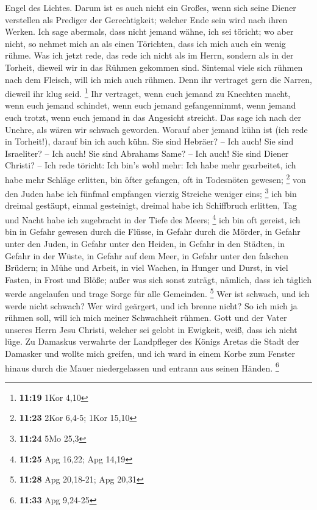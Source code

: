 Engel des Lichtes.  Darum ist es auch nicht ein Großes,
wenn sich seine Diener verstellen als Prediger der Gerechtigkeit;
welcher Ende sein wird nach ihren Werken.  Ich sage
abermals, dass nicht jemand wähne, ich sei töricht; wo aber nicht, so
nehmet mich an als einen Törichten, dass ich mich auch ein wenig rühme.
 Was ich jetzt rede, das rede ich nicht als im Herrn,
sondern als in der Torheit, dieweil wir in das Rühmen gekommen sind.
 Sintemal viele sich rühmen nach dem Fleisch, will ich
mich auch rühmen.  Denn ihr vertraget gern die Narren,
dieweil ihr klug seid. \footnote{\textbf{11:19} 1Kor 4,10}
 Ihr vertraget, wenn euch jemand zu Knechten macht, wenn
euch jemand schindet, wenn euch jemand gefangennimmt, wenn jemand euch
trotzt, wenn euch jemand in das Angesicht streicht.  Das
sage ich nach der Unehre, als wären wir schwach geworden. Worauf aber
jemand kühn ist (ich rede in Torheit!), darauf bin ich auch kühn.
 Sie sind Hebräer? -- Ich auch! Sie sind Israeliter? --
Ich auch! Sie sind Abrahams Same? -- Ich auch!  Sie sind
Diener Christi? -- Ich rede töricht: Ich bin's wohl mehr: Ich habe mehr
gearbeitet, ich habe mehr Schläge erlitten, bin öfter gefangen, oft in
Todesnöten gewesen; \footnote{\textbf{11:23} 2Kor 6,4-5; 1Kor 15,10}
 von den Juden habe ich fünfmal empfangen vierzig
Streiche weniger eins; \footnote{\textbf{11:24} 5Mo 25,3}
 ich bin dreimal gestäupt, einmal gesteinigt, dreimal
habe ich Schiffbruch erlitten, Tag und Nacht habe ich zugebracht in der
Tiefe des Meers; \footnote{\textbf{11:25} Apg 16,22; Apg 14,19}
 ich bin oft gereist, ich bin in Gefahr gewesen durch die
Flüsse, in Gefahr durch die Mörder, in Gefahr unter den Juden, in Gefahr
unter den Heiden, in Gefahr in den Städten, in Gefahr in der Wüste, in
Gefahr auf dem Meer, in Gefahr unter den falschen Brüdern;
 in Mühe und Arbeit, in viel Wachen, in Hunger und Durst,
in viel Fasten, in Frost und Blöße;  außer was sich sonst
zuträgt, nämlich, dass ich täglich werde angelaufen und trage Sorge für
alle Gemeinden. \footnote{\textbf{11:28} Apg 20,18-21; Apg 20,31}
 Wer ist schwach, und ich werde nicht schwach? Wer wird
geärgert, und ich brenne nicht?  So ich mich ja rühmen
soll, will ich mich meiner Schwachheit rühmen.  Gott und
der Vater unseres Herrn Jesu Christi, welcher sei gelobt in Ewigkeit,
weiß, dass ich nicht lüge.  Zu Damaskus verwahrte der
Landpfleger des Königs Aretas die Stadt der Damasker und wollte mich
greifen,  und ich ward in einem Korbe zum Fenster hinaus
durch die Mauer niedergelassen und entrann aus seinen Händen.
\footnote{\textbf{11:33} Apg 9,24-25}

